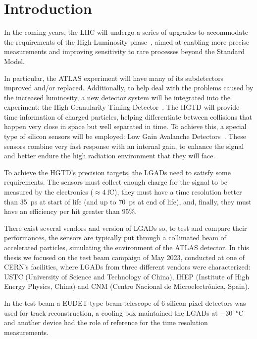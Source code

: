 
\chapter*{Introduction}\label{chap:intro}

In the coming years, the LHC will undergo a series of upgrades to accommodate the requirements of the High-Luminosity phase~\cite{cernHLLHCProject}, aimed at enabling more precise measurements and improving sensitivity to rare processes beyond the Standard Model.

In particular, the ATLAS experiment will have many of its subdetectors improved and/or replaced. Additionally, to help deal with the problems caused by the increased luminosity, a new detector system will be integrated into the experiment: the High Granularity Timing Detector~\cite{cernTechnicalDesign}. The HGTD will provide time information of charged particles, helping differentiate between collisions that happen very close in space but well separated in time. To achieve this, a special type of silicon sensors will be employed: Low Gain Avalanche Detectors~\cite{Pellegrini:2014lki}. These sensors combine very fast response with an internal gain, to enhance the signal and better endure the high radiation environment that they will face.

To achieve the HGTD's precision targets, the LGADs need to satisfy some requirements. The sensors must collect enough charge for the signal to be measured by the electronics (\(\approx \qty{4}{\femto\coulomb} \)), they must have a time resolution better than \qty{35}{\pico\second} at start of life (and up to \qty{70}{\pico\second} at end of life), and, finally, they must have an efficiency per hit greater than \(95\%\).

There exist several vendors and version of LGADs so, to test and compare their performances, the sensors are typically put through a collimated beam of accelerated particles, simulating the environment of the ATLAS detector. In this thesis we focused on the test beam campaign of May 2023, conducted at one of CERN's facilities, where LGADs from three different vendors were characterized: USTC (University of Science and Technology of China), IHEP (Institute of High Energy Physics, China) and CNM (Centro Nacional de Microelectr\'onica, Spain).

In the test beam a EUDET-type beam telescope of 6 silicon pixel detectors was used for track reconstruction, a cooling box maintained the LGADs at \qty{-30}{\degreeCelsius} and another device had the role of reference for the time resolution measurements. 

